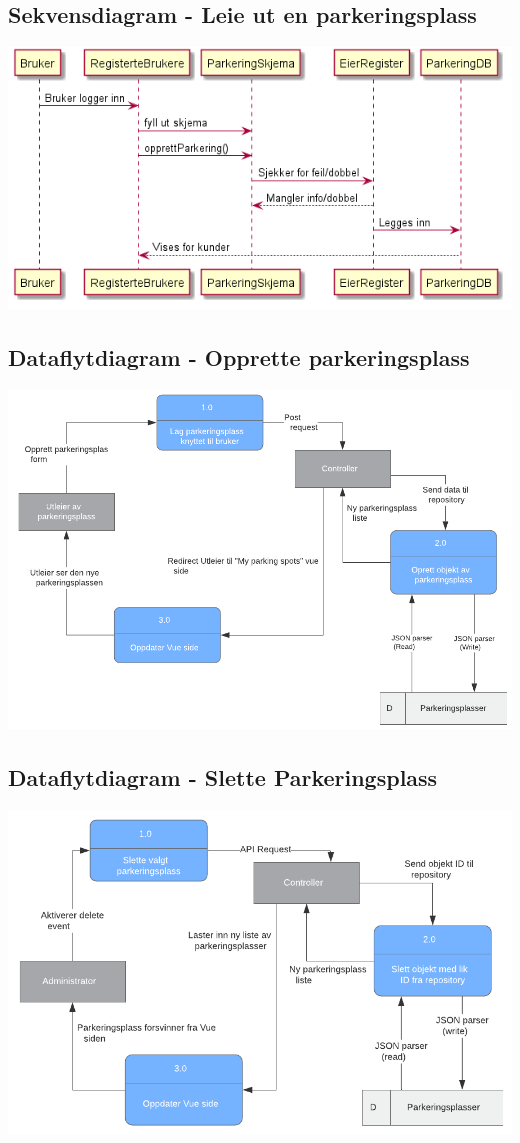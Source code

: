 \documentclass[12pt]{article}
\begin{document}
    \subsection{Sekvensdiagram - Leie ut en parkeringsplass}
    \includegraphics[max width=\textwidth]{bilder/diagrammer/sekvens_legge_ut_parkering.png}

    \subsection{Dataflytdiagram - Opprette parkeringsplass}
    \includegraphics{bilder/diagrammer/dataflyt_opprett_parkering.png}

    \subsection{Dataflytdiagram - Slette Parkeringsplass}
    \includegraphics[max width=\textwidth]{bilder/diagrammer/dataflyt_sletting.png}
\end{document}
